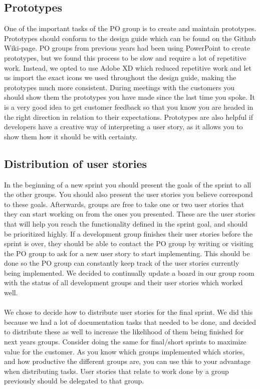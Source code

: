 \subsection{Prototypes}
One of the important tasks of the PO group is to create and maintain prototypes.
Prototypes should conform to the design guide which can be found on the Github Wiki-page.
PO groups from previous years had been using PowerPoint to create prototypes, but we found this process to be slow and require a lot of repetitive work.
Instead, we opted to use Adobe XD which reduced repetitive work and let us import the exact icons we used throughout the design guide, making the prototypes much more consistent.
During meetings with the customers you should show them the prototypes you have made since the last time you spoke.
It is a very good idea to get customer feedback so that you know you are headed in the right direction in relation to their expectations.
Prototypes are also helpful if developers have a creative way of interpreting a user story, as it allows you to show them how it should be with certainty.

\subsection{Distribution of user stories}
In the beginning of a new sprint you should present the goals of the sprint to all the other groups.
You should also present the user stories you believe correspond to these goals.
Afterwards, groups are free to take one or two user stories that they can start working on from the ones you presented.
These are the user stories that will help you reach the functionality defined in the sprint goal, and should be prioritized highly.
If a development group finishes their user stories before the sprint is over, they should be able to contact the PO group by writing or visiting the PO group to ask for a new user story to start implementing.
This should be done so the PO group can constantly keep track of the user stories currently being implemented.
We decided to continually update a board in our group room with the status of all development groups and their user stories which worked well.
\\\\
We chose to decide how to distribute user stories for the final sprint.
We did this because we had a lot of documentation tasks that needed to be done, and decided to distribute these as well to increase the likelihood of them being finished for next years groups.
Consider doing the same for final/short sprints to maximize value for the customer.
As you know which groups implemented which stories, and how productive the different groups are, you can use this to your advantage when distributing tasks.
User stories that relate to work done by a group previously should be delegated to that group.


